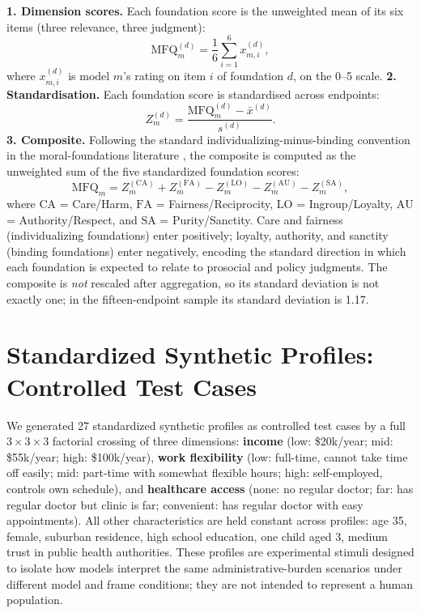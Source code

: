 \textbf{1. Dimension scores.} Each foundation score is the unweighted mean of its six items (three relevance, three judgment):
\[
\mathrm{MFQ}_{m}^{(d)} = \frac{1}{6}\sum_{i=1}^{6} x_{m,i}^{(d)},
\]
where $x_{m,i}^{(d)}$ is model $m$'s rating on item $i$ of foundation $d$, on the 0--5 scale.
\textbf{2. Standardisation.} Each foundation score is standardised across endpoints:
\[
Z^{(d)}_m = \frac{\mathrm{MFQ}^{(d)}_m - \bar{x}^{(d)}}{s^{(d)}}.
\]
\textbf{3. Composite.} Following the standard individualizing-minus-binding convention in the moral-foundations literature \citep{Graham2011}, the composite is computed as the unweighted sum of the five standardized foundation scores:
\[
\mathrm{MFQ}_m = Z^{(\mathrm{CA})}_m + Z^{(\mathrm{FA})}_m - Z^{(\mathrm{LO})}_m - Z^{(\mathrm{AU})}_m - Z^{(\mathrm{SA})}_m,
\]
where $\mathrm{CA}$ = Care/Harm, $\mathrm{FA}$ = Fairness/Reciprocity, $\mathrm{LO}$ = Ingroup/Loyalty, $\mathrm{AU}$ = Authority/Respect, and $\mathrm{SA}$ = Purity/Sanctity. Care and fairness (individualizing foundations) enter positively; loyalty, authority, and sanctity (binding foundations) enter negatively, encoding the standard direction in which each foundation is expected to relate to prosocial and policy judgments. The composite is \emph{not} rescaled after aggregation, so its standard deviation is not exactly one; in the fifteen-endpoint sample its standard deviation is 1.17.

\clearpage   %
\section{Standardized Synthetic Profiles: Controlled Test Cases}
\label{app:profiles}

We generated 27 standardized synthetic profiles as controlled test cases by a full $3 \times 3 \times 3$ factorial crossing of three dimensions: \textbf{income} (low: \$20k/year; mid: \$55k/year; high: \$100k/year), \textbf{work flexibility} (low: full-time, cannot take time off easily; mid: part-time with somewhat flexible hours; high: self-employed, controls own schedule), and \textbf{healthcare access} (none: no regular doctor; far: has regular doctor but clinic is far; convenient: has regular doctor with easy appointments). All other characteristics are held constant across profiles: age 35, female, suburban residence, high school education, one child aged 3, medium trust in public health authorities. These profiles are experimental stimuli designed to isolate how models interpret the same administrative-burden scenarios under different model and frame conditions; they are not intended to represent a human population.

